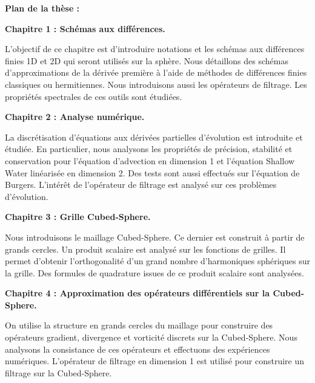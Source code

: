 \vspace{1.3cm}
\textbf{Plan de la thèse :}

\textbf{Chapitre 1 : Schémas aux différences.}

L'objectif de ce chapitre est d'introduire notations et les schémas aux différences finies 1D et 2D qui seront utilisés sur la sphère. Nous détaillons des schémas d'approximations de la dérivée première à l'aide de méthodes de différences finies classiques ou hermitiennes. Nous introduisons aussi les opérateurs de filtrage. Les propriétés spectrales de ces outils sont étudiées.







\vspace{0.7cm}
\textbf{Chapitre 2 : Analyse numérique.}

La discrétisation d'équations aux dérivées partielles d'évolution est introduite et étudiée. En particulier, nous analysons les propriétés de précision, stabilité et conservation pour l'équation d'advection en dimension 1 et l'équation Shallow Water linéarisée en dimension 2. Des tests sont aussi effectués sur l'équation de Burgers. L'intérêt de l'opérateur de filtrage est analysé sur ces problèmes d'évolution.







\vspace{0.7cm}
\textbf{Chapitre 3 : Grille Cubed-Sphere.}

Nous introduisons le maillage Cubed-Sphere. Ce dernier est construit à partir de grands cercles. Un produit scalaire est analysé sur les fonctions de grilles. Il permet d'obtenir l'orthogonalité d'un grand nombre d'harmoniques sphériques sur la grille. Des formules de quadrature issues de ce produit scalaire sont analysées.






\vspace{0.7cm}
\textbf{Chapitre 4 : Approximation des opérateurs différentiels sur la Cubed-Sphere.}

On utilise la structure en grands cercles du maillage pour construire des opérateurs gradient, divergence et vorticité discrets sur la Cubed-Sphere. Nous analysons la consistance de ces opérateurs et effectuons des expériences numériques. L'opérateur de filtrage en dimension 1 est utilisé pour construire un filtrage sur la Cubed-Sphere.







